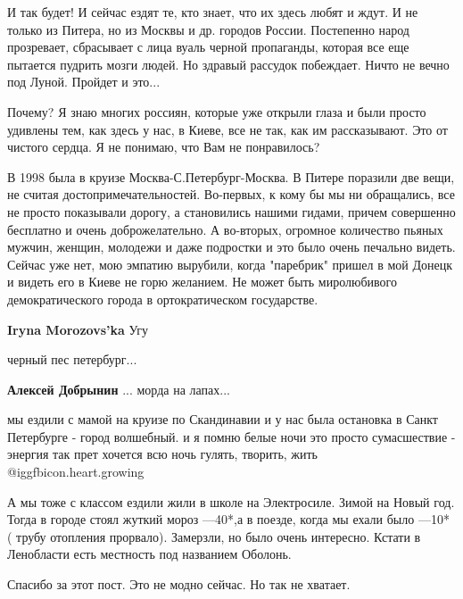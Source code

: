 \begin{itemize}

И так будет! И сейчас ездят те, кто знает, что их здесь любят и ждут. И не
только из Питера, но из Москвы и др. городов России. Постепенно народ
прозревает, сбрасывает с лица вуаль черной пропаганды, которая все еще пытается
пудрить мозги людей. Но здравый рассудок побеждает. Ничто не вечно под Луной.
Пройдет и это...

\begin{itemize} %

Почему? Я знаю многих россиян, которые уже открыли глаза и были просто удивлены
тем, как здесь у нас, в Киеве, все не так, как им рассказывают. Это от чистого
сердца. Я не понимаю, что Вам не понравилось?

\end{itemize} %


В 1998 была в круизе Москва-С.Петербург-Москва. В Питере поразили две вещи, не
считая достопримечательностей. Во-первых, к кому бы мы ни обращались, все не
просто показывали дорогу, а становились нашими гидами, причем совершенно
бесплатно и очень доброжелательно. А во-вторых, огромное количество пьяных
мужчин, женщин, молодежи и даже подростки и это было очень печально видеть.
Сейчас уже нет, мою эмпатию вырубили, когда "паребрик" пришел в мой Донецк и
видеть его в Киеве не горю желанием. Не может быть миролюбивого
демократического города в ортократическом государстве.

\textbf{Iryna Morozovs'ka} Угу

черный пес петербург...

\textbf{Алексей Добрынин} ... морда на лапах...


мы ездили с мамой на круизе по Скандинавии и у нас была остановка в Санкт Петербурге - город волшебный.
и я помню белые ночи это просто сумасшествие - энергия так прет хочется всю ночь гулять, творить, жить  @igg{fbicon.heart.growing} 


А мы тоже с классом ездили жили в школе на Электросиле. Зимой на Новый год.
Тогда в городе стоял жуткий мороз —40*,а в поезде, когда мы ехали было —10* (
трубу отопления прорвало). Замерзли, но было очень интересно. Кстати в
Ленобласти есть местность под названием Оболонь.

Спасибо за этот пост. Это не модно сейчас. Но так не хватает.


\end{itemize}
